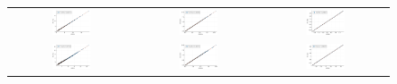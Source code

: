 \begin{figure}[hbtp]
	\centering
	\begin{tabular}{ccc}
		\includegraphics[width=0.33\textwidth]{Figures/PotentialStudy/Psi_P_CorrelationTest} &
		\includegraphics[width=0.33\textwidth]{Figures/PotentialStudy/Psi_E0_CorrelationTest} &
		\includegraphics[width=0.33\textwidth]{Figures/PotentialStudy/Psi_theta_CorrelationTest} \\
		\includegraphics[width=0.33\textwidth]{Figures/PotentialStudy/e_P_CorrelationTest} &
\includegraphics[width=0.33\textwidth]{Figures/PotentialStudy/e_E0_CorrelationTest} &
\includegraphics[width=0.33\textwidth]{Figures/PotentialStudy/e_theta_CorrelationTest} \\		%

\end{tabular}
\end{figure}
